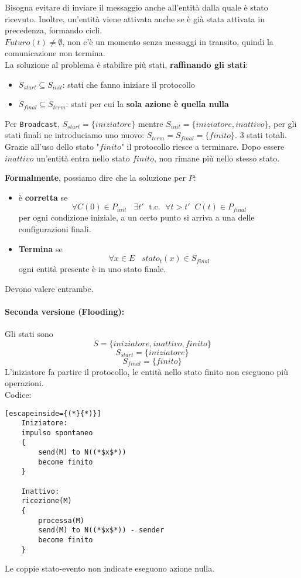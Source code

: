 Bisogna evitare di inviare il messaggio anche all'entità dalla quale è stato ricevuto. Inoltre, un'entità viene attivata anche se è già stata attivata in precedenza, formando cicli.\\

$Futuro(t) \neq \emptyset$, non c'è un momento senza messaggi in transito, quindi la comunicazione non termina.\\

La soluzione al problema è stabilire più stati, \textbf{raffinando gli stati}:
\begin{itemize}
	\item $S_{start} \subseteq S_{init}$: stati che fanno iniziare il protocollo
	\item $S_{final} \subseteq S_{term}$: stati per cui la \textbf{sola azione è quella nulla} 
\end{itemize}
Per \texttt{Broadcast}, $S_{start} = \{iniziatore\}$ mentre $S_{init} = \{iniziatore, inattivo\}$, per gli stati finali ne introduciamo uno nuovo: $S_{term} = S_{final} = \{finito\}$. 3 stati totali.\\

Grazie all'uso dello stato "$finito$" il protocollo riesce a terminare. Dopo essere $inattivo$ un'entità entra nello stato $finito$, non rimane più nello stesso stato.\\

\newpage

\textbf{Formalmente}, possiamo dire che la soluzione per $P$: 
\begin{itemize}
	\item è \textbf{corretta} se
	$$ \forall C(0) \in P_{init} \;\;\; \exists t'  \; \text{ t.c. } \; \forall t > t' \;\; C(t) \in P_{final} $$
	per ogni condizione iniziale, a un certo punto si arriva a una delle configurazioni finali.\\
	
	\item \textbf{Termina} se
	$$ \forall x \in E \;\;\; stato_t (x) \in S_{final} $$
	ogni entità presente è in uno stato finale.\\
\end{itemize}

Devono valere entrambe.

\paragraph{Seconda versione (Flooding):} Gli stati sono
$$ S = \{iniziatore, inattivo, finito\} $$
$$ S_{start} = \{iniziatore\} $$
$$ S_{final} = \{finito\}$$
L'iniziatore fa partire il protocollo, le entità nello stato finito non eseguono più operazioni.\\
Codice:
\begin{lstlisting}[escapeinside={(*}{*)}]
	Iniziatore: 
	impulso spontaneo
	{	
		send(M) to N((*$x$*))
		become finito
	}
	
	Inattivo: 
	ricezione(M)
	{	
		processa(M)
		send(M) to N((*$x$*)) - sender
		become finito
	}
\end{lstlisting}
Le coppie stato-evento non indicate eseguono azione nulla.\\

